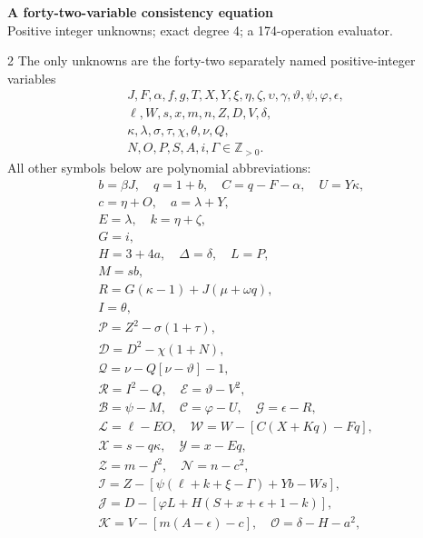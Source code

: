 \documentclass[10pt]{article}
\begin{document}
\begin{center}
{\large\bfseries A forty-two-variable consistency equation}\\[-1pt]
{\small Positive integer unknowns; exact degree 4; a 174-operation evaluator.}
\end{center}\vspace{-8pt}
\begin{multicols}{2}
\fontsize{8.6}{9.1}\selectfont
The only unknowns are the forty-two separately named positive-integer variables
\[
\begin{gathered}J,F,\alpha,f,g,T,X,Y,\xi,\eta,\zeta,\upsilon,\gamma,\vartheta,\psi,\varphi,\epsilon,\\
\ell,W,s,x,m,n,Z,D,V,\delta,\\
\kappa,\lambda,\sigma,\tau,\chi,\theta,\nu,Q,\\
N,O,P,S,A,i,\Gamma\in\mathbb Z_{>0}.\end{gathered}
\]
All other symbols below are polynomial abbreviations:
\[
\begin{gathered}
b=\beta J,\quad q=1+b,\quad C=q-F-\alpha,\quad U=Y\kappa,\\
c=\eta+O,\quad a=\lambda+Y,\\
E=\lambda,\quad k=\eta+\zeta,\\
G=i,\\
H=3+4a,\quad\Delta=\delta,\quad L=P,\\
M=sb,\\
R=G(\kappa-1)+J(\mu+\omega q),\\
I=\theta,\\
\mathcal{P}=Z^2-\sigma(1+\tau),\\
\mathcal{D}=D^2-\chi(1+N),\\
\mathcal{Q}=\nu-Q[\nu-\vartheta]-1,\\
\mathcal{R}=I^2-Q,\quad \mathcal{E}=\vartheta-V^2,\\
\mathcal{B}=\psi-M,\quad \mathcal{C}=\varphi-U,\quad \mathcal{G}=\epsilon-R,\\
\mathcal{L}=\ell-EO,\quad \mathcal{W}=W-[C(X+Kq)-Fq],\\
\mathcal{X}=s-q\kappa,\quad \mathcal{Y}=x-Eq,\\
\mathcal{Z}=m-f^2,\quad \mathcal{N}=n-c^2,\\
\mathcal{I}=Z-[\psi(\ell+k+\xi-\Gamma)+Yb-Ws],\\
\mathcal{J}=D-[\varphi L+H(S+x+\epsilon+1-k)],\\
\mathcal{K}=V-[m(A-\epsilon)-c],\quad\mathcal{O}=\delta-H-a^2,\\

\end{gathered}\]
\end{multicols}
\end{document}
